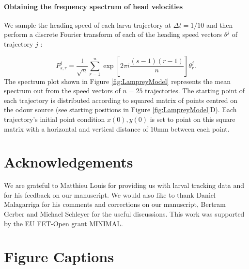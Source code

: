 \documentclass[11pt,a4paper]{article}
\begin{document}
\paragraph{Obtaining the frequency spectrum of head velocities}
We sample the heading speed of each larva trajectory at $\Delta t = 1/10$ and then perform a discrete Fourier transform of each of the heading speed vectors $\theta^j$ of trajectory $j$ :

\begin{equation}
F_{s,r}^j = \frac{1}{\sqrt{n}} \sum_{r=1}^n \exp{\left[2 \pi i \frac{ (s-1)(r-1)}{n}\right]} \theta_r^j.
\end{equation}
The spectrum plot shown in Figure \ref{fig:LampreyModel} represents the mean spectrum  out from the speed vectors of $n=25$ trajectories. The starting point of each trajectory is distributed according to squared matrix of points centred on the odour source (see starting positions in Figure \ref{fig:LampreyModel}D). Each trajectory's initial point condition $x(0),y(0)$ is set to point on this square matrix with a horizontal and vertical distance of 10mm between each point.



\section{Acknowledgements}
We are grateful to Matthieu Louis for providing us with larval tracking data and for his feedback on our manuscript. We would also like to thank Daniel Malagarriga for his comments and corrections on our manuscript,  Bertram Gerber and Michael Schleyer for the useful discussions. This work was supported by the EU FET-Open grant MINIMAL.


\newpage

\clearpage

\section{Figure Captions}
\end{document}

